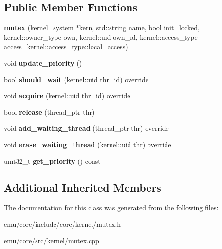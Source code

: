 \subsection*{Public Member Functions}
\begin{DoxyCompactItemize}
\item 
\mbox{\label{classeka2l1_1_1kernel_1_1mutex_a2325908b5d7d2a828e3fbaca3a541eca}} 
{\bfseries mutex} (\mbox{\hyperlink{classeka2l1_1_1kernel__system}{kernel\+\_\+system}} $\ast$kern, std\+::string name, bool init\+\_\+locked, kernel\+::owner\+\_\+type own, kernel\+::uid own\+\_\+id, kernel\+::access\+\_\+type access=kernel\+::access\+\_\+type\+::local\+\_\+access)
\item 
\mbox{\label{classeka2l1_1_1kernel_1_1mutex_aef5e7c457295d13cef55e918bbc7dac5}} 
void {\bfseries update\+\_\+priority} ()
\item 
\mbox{\label{classeka2l1_1_1kernel_1_1mutex_a2385e41d05185c951e4b4a0021fc0060}} 
bool {\bfseries should\+\_\+wait} (kernel\+::uid thr\+\_\+id) override
\item 
\mbox{\label{classeka2l1_1_1kernel_1_1mutex_a7a5bda39e8ad6adc11a875ccd35d3805}} 
void {\bfseries acquire} (kernel\+::uid thr\+\_\+id) override
\item 
\mbox{\label{classeka2l1_1_1kernel_1_1mutex_ad5d6f8c26b7088d562bcf43b3d643741}} 
bool {\bfseries release} (thread\+\_\+ptr thr)
\item 
\mbox{\label{classeka2l1_1_1kernel_1_1mutex_aee93d5140ac040325dbd0dfbecf2433e}} 
void {\bfseries add\+\_\+waiting\+\_\+thread} (thread\+\_\+ptr thr) override
\item 
\mbox{\label{classeka2l1_1_1kernel_1_1mutex_a392ff128be46ab9e5977d32035fbe697}} 
void {\bfseries erase\+\_\+waiting\+\_\+thread} (kernel\+::uid thr) override
\item 
\mbox{\label{classeka2l1_1_1kernel_1_1mutex_afbbd4660822ef94fab16330096f93112}} 
uint32\+\_\+t {\bfseries get\+\_\+priority} () const
\end{DoxyCompactItemize}
\subsection*{Additional Inherited Members}


The documentation for this class was generated from the following files\+:\begin{DoxyCompactItemize}
\item 
emu/core/include/core/kernel/mutex.\+h\item 
emu/core/src/kernel/mutex.\+cpp\end{DoxyCompactItemize}
